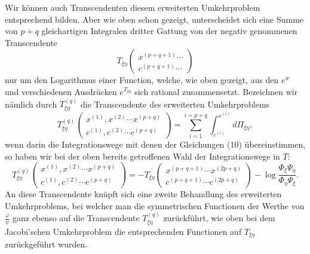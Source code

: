 \documentclass[10pt]{article}
\begin{document}
Wir können auch Transcendenten diesem erweiterten Umkehrproblem entsprechend bilden. Aber wie oben schon gezeigt, unterscheidet sich eine Summe von \(p+q\) gleichartigen Integralen dritter Gattung von der negativ genommenen Transcendente
\[
T_{\xi\eta}\begin{pmatrix}x^{(p+q+1)}\cdots\\c^{(p+q+1)}\cdots\end{pmatrix}
\]
nur um den Logarithmus einer Function, welche, wie oben gezeigt, aus den \(e^w\) und verschiedenen Ausdrücken \(e^{T_{\xi\eta}}\) sich rational zusammensetzt. Bezeichnen wir nämlich durch \(T^{(q)}_{\xi\eta}\) die Transcendente des erweiterten Umkehrproblems
\[
T^{(q)}_{\xi\eta}\begin{pmatrix}x^{(1)},x^{(2)}\cdots x^{(p+q)}\\c^{(1)},c^{(2)}\cdots c^{(p+q)}\end{pmatrix}
=\sum_{i=1}^{i=p+q}\int_{c^{(i)}}^{x^{(i)}}d\Pi_{\xi\eta},
\]
wenn darin die Integrationswege mit denen der Gleichungen (10) übereinstimmen, so haben wir bei der oben bereits getroffenen Wahl der Integrationswege in \(T\):
\begingroup\footnotesize
\[
T^{(q)}_{\xi\eta}\begin{pmatrix}x^{(1)},x^{(2)}\cdots x^{(p+q)}\\c^{(1)},c^{(2)}\cdots c^{(p+q)}\end{pmatrix}
=-T_{\xi\eta}\begin{pmatrix}x^{(p+q+1)}\cdots x^{(2p+q)}\\c^{(p+q+1)}\cdots c^{(2p+q)}\end{pmatrix}
-\log\frac{\Phi_\xi\Psi_\eta}{\Phi_\eta\Psi_\xi}.
\]
\endgroup
An diese Transcendente knüpft sich eine zweite Behandlung des erweiterten Umkehrproblems, bei welcher man die symmetrischen Functionen der Werthe von \(\frac{\varphi}{\psi}\) ganz ebenso auf die Transcendente \(T_{\xi\eta}^{(q)}\) zurückführt, wie oben bei dem Jacobi'schen Umkehrproblem die entsprechenden Functionen auf \(T_{\xi\eta}\) zurückgeführt wurden.
\end{document}
